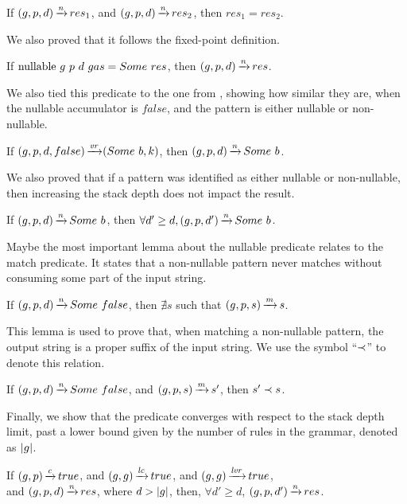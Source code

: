 \begin{lemma}
    If $(g,p,d) \operatorname{\xrightarrow{\mathit{n}}} res_1$,
    and $(g,p,d) \operatorname{\xrightarrow{\mathit{n}}} res_2$,
    then $res_1 = res_2$.
\end{lemma}

We also proved that it follows
the fixed-point definition.

\begin{lemma}
    If $\text{nullable}\ g\ p\ d\ gas = Some\ res$,
    then $(g,p,d) \operatorname{\xrightarrow{\mathit{n}}} res$.
\end{lemma}

We also tied this predicate to the
one from ,
showing how similar they are,
when the nullable accumulator is $false$,
and the pattern is either nullable or non-nullable.

\begin{lemma}%
    If $(g,p,d,false) \operatorname{\xrightarrow{\mathit{vr}}} (Some\ b,k)$,
    then $(g,p,d) \operatorname{\xrightarrow{\mathit{n}}} Some\ b$.
\end{lemma}

We also proved that if a pattern
was identified as either nullable or non-nullable,
then increasing the stack depth does not impact the result.

\begin{lemma}%
    If $(g,p,d) \operatorname{\xrightarrow{\mathit{n}}} Some\ b$,
    then $\forall d' \ge d, (g,p,d') \operatorname{\xrightarrow{\mathit{n}}} Some\ b$.
\end{lemma}

Maybe the most important lemma
about the nullable predicate
relates to the match predicate.
It states that a non-nullable pattern
never matches without consuming
some part of the input string.

\begin{lemma}%
    If $(g,p,d) \operatorname{\xrightarrow{\mathit{n}}} Some\ false$,
    then $\nexists s$ such that $(g,p,s) \operatorname{\xrightarrow{\mathit{m}}} s$.
\end{lemma}

This lemma is used to prove that,
when matching a non-nullable pattern,
the output string is a proper suffix of the input string.
We use the symbol ``$\prec$''
to denote this relation.

\begin{lemma}%
    \label{lemma:non-nullable-pattern-proper-suffix}
    If $(g,p,d) \operatorname{\xrightarrow{\mathit{n}}} Some\ false$,
    and $(g,p,s) \operatorname{\xrightarrow{\mathit{m}}} s'$,
    then $s' \prec s$.
\end{lemma}

Finally, we show that the predicate converges
with respect to the stack depth limit,
past a lower bound given by the number of rules in the grammar,
denoted as $|g|$.

\begin{lemma}%
    If $(g,p) \operatorname{\xrightarrow{\mathit{c}}} true$,
    and $(g,g) \operatorname{\xrightarrow{\mathit{lc}}} true$,
    and $(g,g) \operatorname{\xrightarrow{\mathit{lvr}}} true$, \\
    and $(g,p,d) \operatorname{\xrightarrow{\mathit{n}}} res$,
    where $d > |g|$,
    then, $\forall d' \ge d$,
    $(g,p,d') \operatorname{\xrightarrow{\mathit{n}}} res$.
\end{lemma}
